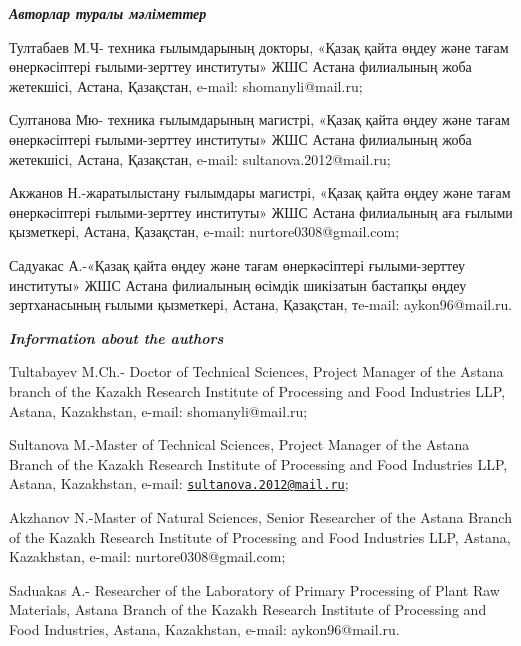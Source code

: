 \begin{authorinfo}
\emph{{\bfseries Авторлар туралы мәліметтер}}

Тултабаев М.Ч- техника ғылымдарының докторы, «Қазақ қайта өңдеу және
тағам өнеркәсіптері ғылыми-зерттеу институты» ЖШС Астана филиалының жоба
жетекшісі, Астана, Қазақстан, e-mail: shomanyli@mail.ru;

Султанова Мю- техника ғылымдарының магистрі, «Қазақ қайта өңдеу және
тағам өнеркәсіптері ғылыми-зерттеу институты» ЖШС Астана филиалының жоба
жетекшісі, Астана, Қазақстан, e-mail: sultanova.2012@mail.ru;

Акжанов Н.-жаратылыстану ғылымдары магистрі, «Қазақ қайта өңдеу және
тағам өнеркәсіптері ғылыми-зерттеу институты» ЖШС Астана филиалының аға
ғылыми қызметкері, Астана, Қазақстан, e-mail: nurtore0308@gmail.com;

Садуакас А.-«Қазақ қайта өңдеу және тағам өнеркәсіптері ғылыми-зерттеу
институты» ЖШС Астана филиалының өсімдік шикізатын бастапқы өңдеу
зертханасының ғылыми қызметкері, Астана, Қазақстан, тe-mail:
aykon96@mail.ru.

\emph{{\bfseries Information about the authors}}

Tultabayev M.Ch.- Doctor of Technical Sciences, Project Manager of the
Astana branch of the Kazakh Research Institute of Processing and Food
Industries LLP, Astana, Kazakhstan, e-mail: shomanyli@mail.ru;

Sultanova M.-Master of Technical Sciences, Project Manager of the Astana
Branch of the Kazakh Research Institute of Processing and Food
Industries LLP, Astana, Kazakhstan, e-mail:
\href{mailto:sultanova.2012@mail.ru}{\nolinkurl{sultanova.2012@mail.ru}};

Akzhanov N.-Master of Natural Sciences, Senior Researcher of the Astana
Branch of the Kazakh Research Institute of Processing and Food
Industries LLP, Astana, Kazakhstan, e-mail: nurtore0308@gmail.com;

Saduakas A.- Researcher of the Laboratory of Primary Processing of Plant
Raw Materials, Astana Branch of the Kazakh Research Institute of
Processing and Food Industries, Astana, Kazakhstan, e-mail:
aykon96@mail.ru.
\end{authorinfo}
